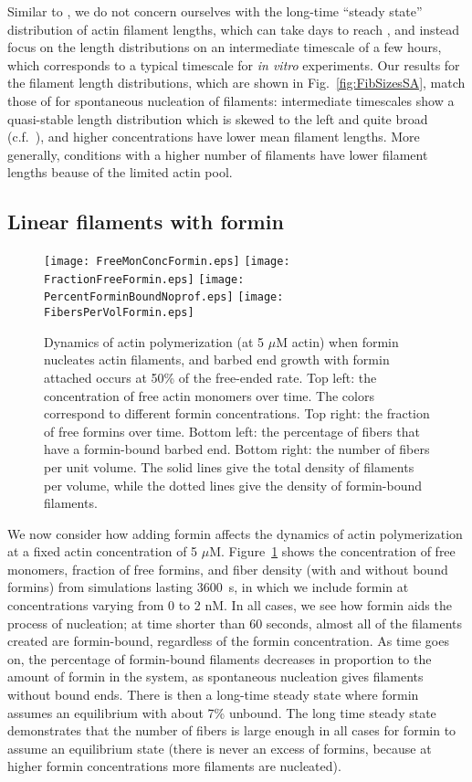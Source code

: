 \documentclass[11pt]{article}
\begin{document}
Similar to \cite{banerjee2022emergence}, we do not concern ourselves with the long-time ``steady state'' distribution of actin filament lengths, which can take days to reach \cite{hu2007theoretical, fass2008stochastic, mohapatra2017limiting}, and instead focus on the length distributions on an intermediate timescale of a few hours, which corresponds to a typical timescale for \emph{in vitro} experiments. Our results for the filament length distributions, which are shown in Fig.\ \ref{fig:FibSizesSA}, match those of \cite{banerjee2022emergence} for spontaneous nucleation of filaments: intermediate timescales show a quasi-stable length distribution which is skewed to the left and quite broad (c.f.\ \cite[Fig.~2c]{banerjee2022emergence}), and higher concentrations have lower mean filament lengths. More generally, conditions with a higher number of filaments have lower filament lengths beause of the limited actin pool.

\subsection{Linear filaments with formin}
\begin{figure}
\centering
\texttt{[image: FreeMonConcFormin.eps]}
\texttt{[image: FractionFreeFormin.eps]}
\texttt{[image: PercentForminBoundNoprof.eps]}
\texttt{[image: FibersPerVolFormin.eps]}
\caption{\label{fig:ActinNucWithFormin}Dynamics of actin polymerization (at 5 $\mu$M actin) when formin nucleates actin filaments, and barbed end growth with formin attached occurs at 50\% of the free-ended rate. Top left: the concentration of free actin monomers over time. The colors correspond to different formin concentrations. Top right: the fraction of free formins over time. Bottom left: the percentage of fibers that have a formin-bound barbed end. Bottom right: the number of fibers per unit volume. The solid lines give the total density of filaments per volume, while the dotted lines give the density of formin-bound filaments.}
\end{figure}

We now consider how adding formin affects the dynamics of actin polymerization at a fixed actin concentration of 5 $\mu$M. Figure\ \ref{fig:ActinNucWithFormin} shows the concentration of free monomers, fraction of free formins, and fiber density (with and without bound formins) from simulations lasting 3600~s, in which we include formin at concentrations varying from 0 to 2 nM. In all cases, we see how formin aids the process of nucleation; at time shorter than 60 seconds, almost all of the filaments created are formin-bound, regardless of the formin concentration. As time goes on, the percentage of formin-bound filaments decreases in proportion to the amount of formin in the system, as spontaneous nucleation gives filaments without bound ends. There is then a long-time steady state where formin assumes an equilibrium with about 7\% unbound. The long time steady state demonstrates that the number of fibers is large enough in all cases for formin to assume an equilibrium state (there is never an excess of formins, because at higher formin concentrations more filaments are nucleated).
\end{document}
